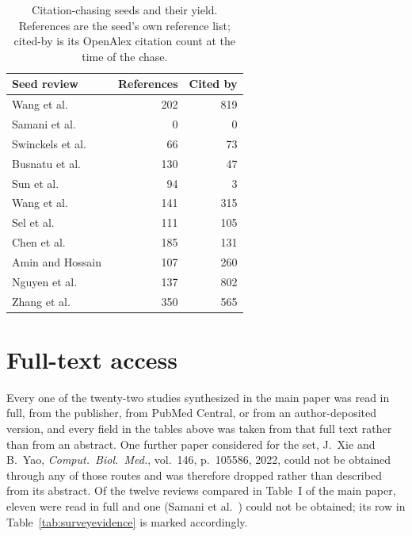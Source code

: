 \documentclass[journal]{IEEEtran}
\begin{document}
\begin{table}[tbp]
\centering
\caption{Citation-chasing seeds and their yield. References are the seed's own reference list;
cited-by is its OpenAlex citation count at the time of the chase.}
\label{tab:chasing}
\footnotesize
\setlength{\tabcolsep}{4pt}
\renewcommand{\arraystretch}{1.1}
\begin{tabular}{@{}p{4.6cm} r r@{}}
\toprule
\textbf{Seed review} & \textbf{References} & \textbf{Cited by} \\
\midrule
Wang et al.~\cite{wang2022deep} & 202 & 819 \\
\addlinespace[1pt]
\rowcolor{tablestripe}Samani et al.~\cite{samani2026stdl} & 0 & 0 \\
\addlinespace[1pt]
Swinckels et al.~\cite{swinckels2024ehr} & 66 & 73 \\
\addlinespace[1pt]
\rowcolor{tablestripe}Busnatu et al.~\cite{Busnatu2022} & 130 & 47 \\
\addlinespace[1pt]
Sun et al.~\cite{sun2026irregularmedical} & 94 & 3 \\
\addlinespace[1pt]
\rowcolor{tablestripe}Wang et al.~\cite{Wang2023Survey} & 141 & 315 \\
\addlinespace[1pt]
Sel et al.~\cite{Sel2025VVUQ} & 111 & 105 \\
\addlinespace[1pt]
\rowcolor{tablestripe}Chen et al.~\cite{chen2024genaitwin} & 185 & 131 \\
\addlinespace[1pt]
Amin and Hossain~\cite{amin2021edgeintel} & 107 & 260 \\
\addlinespace[1pt]
\rowcolor{tablestripe}Nguyen et al.~\cite{nguyen2022FLsmarthealthcare} & 137 & 802 \\
\addlinespace[1pt]
Zhang et al.~\cite{zhang2022harreview} & 350 & 565 \\
\bottomrule
\end{tabular}
\end{table}

\section{Full-text access}
\label{sec:access}
Every one of the twenty-two studies synthesized in the main paper was read in
full, from the publisher, from PubMed Central, or from an author-deposited
version, and every field in the tables above was taken from that full text
rather than from an abstract. One further paper considered for the set,
J.~Xie and B.~Yao, \emph{Comput.\ Biol.\ Med.}, vol.~146, p.~105586, 2022, could
not be obtained through any of those routes and was therefore dropped rather
than described from its abstract. Of the twelve reviews compared in Table~I of
the main paper, eleven were read in full and one
(Samani et al.~\cite{samani2026stdl}) could not be obtained; its row in
Table~\ref{tab:surveyevidence} is marked accordingly.



\end{document}
